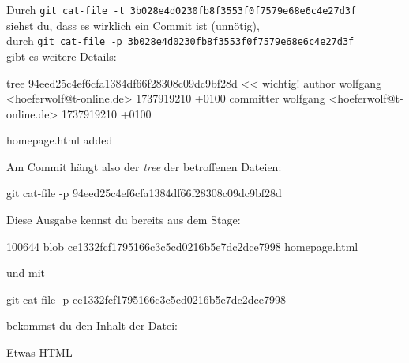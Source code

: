 \documentclass[
  letterpaper,
  DIV=11]{scrreprt}
\newenvironment{Shaded}{\begin{snugshade}}{\end{snugshade}}
\newcommand{\AttributeTok}[1]{\textcolor[rgb]{0.40,0.45,0.13}{#1}}
\newcommand{\ExtensionTok}[1]{\textcolor[rgb]{0.00,0.23,0.31}{#1}}
\newcommand{\FunctionTok}[1]{\textcolor[rgb]{0.28,0.35,0.67}{#1}}
\newcommand{\NormalTok}[1]{\textcolor[rgb]{0.00,0.23,0.31}{#1}}
\newcommand{\OperatorTok}[1]{\textcolor[rgb]{0.37,0.37,0.37}{#1}}
\newcommand{\StringTok}[1]{\textcolor[rgb]{0.13,0.47,0.30}{#1}}
\begin{document}
Durch
\texttt{git\ cat-file\ -t\ 3b028e4d0230fb8f3553f0f7579e68e6c4e27d3f}\\
siehst du, dass es wirklich ein Commit ist (unnötig),\\
durch
\texttt{git\ cat-file\ -p\ 3b028e4d0230fb8f3553f0f7579e68e6c4e27d3f}\\
gibt es weitere Details:

\begin{Shaded}
\begin{Highlighting}[]
\ExtensionTok{tree}\NormalTok{ 94eed25c4ef6cfa1384df66f28308c09dc9bf28d   }\OperatorTok{\textless{}\textless{} wichtig!}
\StringTok{author wolfgang \textless{}hoeferwolf@t{-}online.de\textgreater{} 1737919210 +0100}
\StringTok{committer wolfgang \textless{}hoeferwolf@t{-}online.de\textgreater{} 1737919210 +0100}

\StringTok{homepage.html added}
\end{Highlighting}
\end{Shaded}

Am Commit hängt also der \emph{tree} der betroffenen Dateien:

\begin{Shaded}
\begin{Highlighting}[]
\FunctionTok{git}\NormalTok{ cat{-}file }\AttributeTok{{-}p}\NormalTok{ 94eed25c4ef6cfa1384df66f28308c09dc9bf28d}
\end{Highlighting}
\end{Shaded}

Diese Ausgabe kennst du bereits aus dem Stage:

\begin{Shaded}
\begin{Highlighting}[]
\ExtensionTok{100644}\NormalTok{ blob ce1332fcf1795166c3c5cd0216b5e7dc2dce7998    homepage.html}
\end{Highlighting}
\end{Shaded}

und mit

\begin{Shaded}
\begin{Highlighting}[]
\FunctionTok{git}\NormalTok{ cat{-}file }\AttributeTok{{-}p}\NormalTok{ ce1332fcf1795166c3c5cd0216b5e7dc2dce7998}
\end{Highlighting}
\end{Shaded}

bekommst du den Inhalt der Datei:

\begin{Shaded}
\begin{Highlighting}[]
\ExtensionTok{Etwas}\NormalTok{ HTML}
\end{Highlighting}
\end{Shaded}
\end{document}

